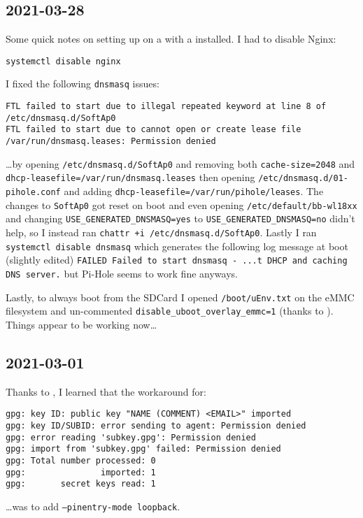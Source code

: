 \documentclass{article}
\begin{document}
\subsection{2021-03-28}
Some quick notes on setting up  on a  with a  installed.  I had to disable Nginx:
\begin{verbatim}
systemctl disable nginx
\end{verbatim}
I fixed the following \texttt{dnsmasq} issues:
\begin{verbatim}
FTL failed to start due to illegal repeated keyword at line 8 of /etc/dnsmasq.d/SoftAp0
FTL failed to start due to cannot open or create lease file /var/run/dnsmasq.leases: Permission denied
\end{verbatim}
\ldots by opening \texttt{/etc/dnsmasq.d/SoftAp0} and removing both \texttt{cache-size=2048} and \texttt{dhcp-leasefile=/var/run/dnsmasq.leases} then opening \texttt{/etc/dnsmasq.d/01-pihole.conf} and adding \texttt{dhcp-leasefile=/var/run/pihole/leases}.  The changes to \texttt{SoftAp0} got reset on boot and even opening \texttt{/etc/default/bb-wl18xx} and changing \texttt{USE_GENERATED_DNSMASQ=yes} to \texttt{USE_GENERATED_DNSMASQ=no} didn't help, so I instead ran \texttt{chattr +i /etc/dnsmasq.d/SoftAp0}.  Lastly I ran \texttt{systemctl disable dnsmasq} which generates the following log message at boot (slightly edited) \texttt{FAILED Failed to start dnsmasq - ...t DHCP and caching DNS server.} but Pi-Hole seems to work fine anyways.

Lastly, to always boot from the SDCard I opened \texttt{/boot/uEnv.txt} on the eMMC filesystem and un-commented \texttt{disable_uboot_overlay_emmc=1} (thanks to ).  Things appear to be working now\ldots

\subsection{2021-03-01}
Thanks to , I learned that the workaround for:
\begin{verbatim}
gpg: key ID: public key "NAME (COMMENT) <EMAIL>" imported
gpg: key ID/SUBID: error sending to agent: Permission denied
gpg: error reading 'subkey.gpg': Permission denied
gpg: import from 'subkey.gpg' failed: Permission denied
gpg: Total number processed: 0
gpg:               imported: 1
gpg:       secret keys read: 1
\end{verbatim}
\ldots was to add \texttt{--pinentry-mode loopback}.
\end{document}
